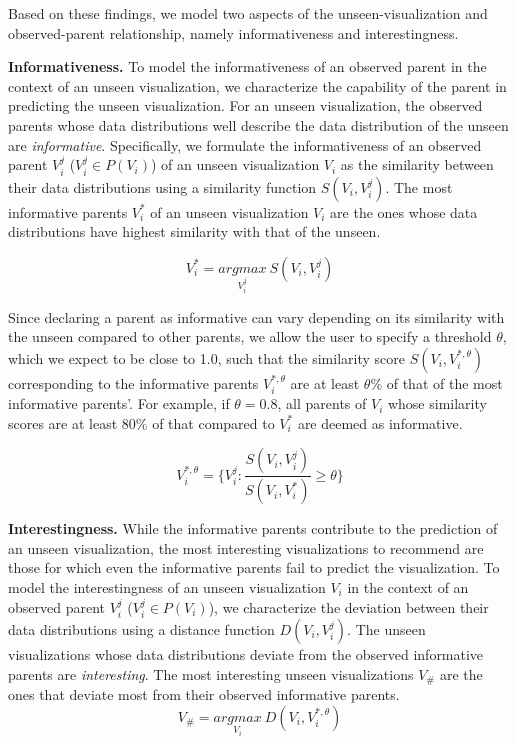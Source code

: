 Based on these findings, we model two aspects of the unseen-visualization and observed-parent relationship, namely informativeness and interestingness. 

\textbf{Informativeness.} To model the informativeness of an observed parent in the context of an unseen visualization, we characterize the capability of the parent in predicting the unseen visualization. For an unseen visualization, the observed parents whose data distributions well describe the data distribution of the unseen are \emph{informative}. Specifically, we formulate the informativeness of an observed parent $V_i^j$ ($V_i^j \in P(V_i)$) of an unseen visualization $V_i$ as the similarity between their data distributions using a similarity function $S(V_i, V_i^j)$. The most informative parents $V_i^*$ of an unseen visualization $V_i$ are the ones whose data distributions have highest similarity with that of the unseen.

\begin{equation}
    V_i^*=\underset{V_i^j}{argmax}\ S(V_i, V_i^j)
\end{equation}

Since declaring a parent as informative can vary depending on its similarity with the unseen compared to other parents, we allow the user to specify a threshold $\theta$, which we expect to be close to 1.0, such that the similarity score $S(V_i, V_i^{*, \theta})$ corresponding to the informative parents $V_i^{*, \theta}$ are at least $\theta\%$ of that of the most informative parents'. For example, if $\theta = 0.8$, all parents of $V_i$ whose similarity scores are at least 80\% of that compared to $V_i^*$ are deemed as informative. 

\begin{equation}
    V_i^{*, \theta} = \{V_i^j : \frac{S(V_i, V_i^j)}{S(V_i, V_i^*)} \ge \theta\}
\end{equation}

\textbf{Interestingness.} While the informative parents contribute to the prediction of an unseen visualization, the most interesting visualizations to recommend are those for which even the informative parents fail to predict the visualization. To model the interestingness of an unseen visualization $V_i$ in the context of an observed parent $V_i^j$ ($V_i^j \in P(V_i)$), we characterize the deviation between their data distributions using a distance function $D(V_i, V_i^j)$. The unseen visualizations whose data distributions deviate from the observed informative parents are \emph{interesting}. The most interesting unseen visualizations $V_\#$ are the ones that deviate most from their observed informative parents.
\begin{equation}
    V_\#=\underset{V_i}{argmax} \ D(V_i, V_i^{*, \theta})
\end{equation}

